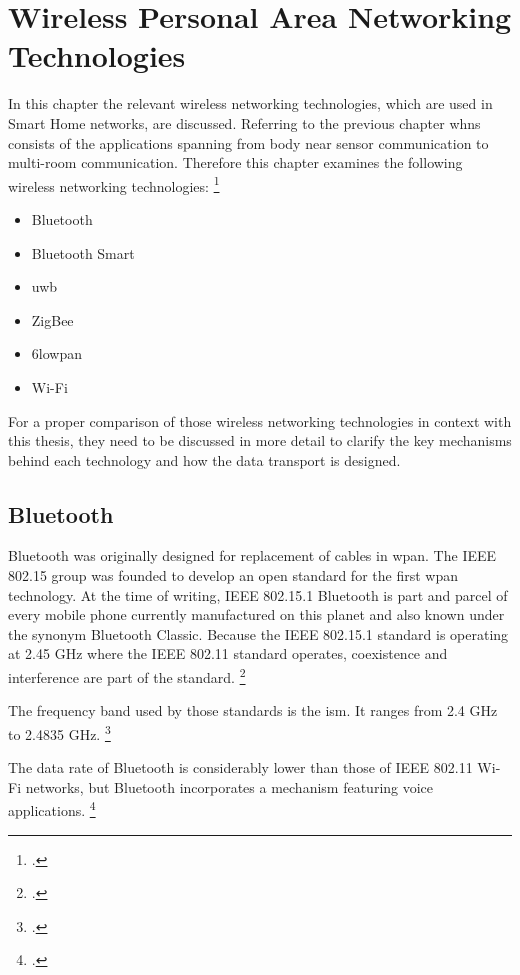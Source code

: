 \chapter{Wireless Personal Area Networking Technologies}
\label{ch:wpan}

In this chapter the relevant wireless networking technologies, which are used in Smart Home networks, are discussed. Referring to the previous chapter \glspl{whn} consists of the applications spanning from body near sensor communication to multi-room communication. Therefore this chapter examines the following wireless networking technologies: \footcite[Cf.][]{Hunn2010}

\begin{itemize}
  \item Bluetooth
  \item Bluetooth Smart
  \item \gls{uwb}
  \item ZigBee
  \item \gls{6lowpan}
  \item Wi-Fi
\end{itemize}

For a proper comparison of those wireless networking technologies in context with this thesis, they need to be discussed in more detail to clarify the key mechanisms behind each technology and how the data transport is designed.

\section{Bluetooth}
\label{sec:bluetooth}

Bluetooth was originally designed for replacement of cables in \gls{wpan}. The IEEE 802.15 group was founded to develop an open standard for the first \gls{wpan} technology. At the time of writing, IEEE 802.15.1 Bluetooth is part and parcel of every mobile phone currently manufactured on this planet and also known under the synonym Bluetooth Classic. Because the IEEE 802.15.1 standard is operating at 2.45 GHz where the IEEE 802.11 standard operates, coexistence and interference are part of the standard. \footcite[Cf.][19]{Al-Qutayri2010}

The frequency band used by those standards is the \gls{ism}. It ranges from 2.4 GHz to 2.4835 GHz. \footcite[Cf.][19]{Al-Qutayri2010}

The data rate of Bluetooth is considerably lower than those of IEEE 802.11 Wi-Fi networks, but Bluetooth incorporates a mechanism featuring voice applications. \footcite[Cf.][445-446]{Pahlavan2009}

